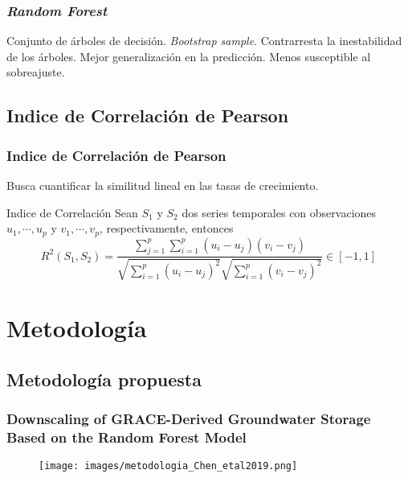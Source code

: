 \documentclass{beamer}
\begin{document}
  \begin{frame}
    \frametitle{\textit{Random Forest}}

    \begin{outline}
      \1 Conjunto de árboles de decisión.
        \2 \textit{Bootstrap sample}.
      \1 Contrarresta la inestabilidad de los árboles.
      \1 Mejor generalización en la predicción.
      \1 Menos susceptible al sobreajuste.
    \end{outline}
  \end{frame}

  \subsection*{Indice de Correlación de Pearson}

  \begin{frame}
    \frametitle{Indice de Correlación de Pearson}

    \begin{outline}
      \1 Busca cuantificar la similitud lineal en las tasas de crecimiento.
    \end{outline}

    \begin{block}{Indice de Correlación}
      Sean $ S_1 $ y $ S_2 $ dos series temporales con observaciones $ u_1,\cdots, u_p $ y $ v_1,\cdots,v_p $, respectivamente, entonces
      $$ R^2(S_1,S_2) = \frac{\sum_{j=1}^p\sum_{i=1}^p(u_i-u_j)(v_i-v_j)} {\sqrt{\sum_{i=1}^p(u_i-u_j)^2}\sqrt{\sum_{i=1}^p(v_i-v_j)^2}} \in [-1,1]$$
    \end{block}

  \end{frame}

  \section{Metodología}
  \subsection*{Metodología propuesta}

  \begin{frame}
    \frametitle{Downscaling of GRACE-Derived Groundwater Storage Based on the Random Forest Model}

    \begin{figure}
      \begin{center}
        \texttt{[image: images/metodologia\_Chen\_etal2019.png]}
      \end{center}
  \end{figure}
    
  \end{frame}
\end{document}
